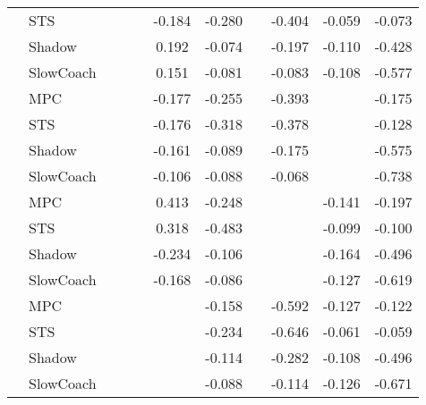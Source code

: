 \begin{tabular}{|l|l|*{9}{c|}}
                                                           & STS &       &        &        & -0.184 & -0.280 &     &  -0.404 &  -0.059 &   -0.073 \\
                                                           & Shadow &       &        &        &  0.192 & -0.074 &     &  -0.197 &  -0.110 &   -0.428 \\
                                                           & SlowCoach &       &        &        &  0.151 & -0.081 &     &  -0.083 &  -0.108 &   -0.577 \\
\midrule
[False, False, False, True, True, False, True, False, True] & MPC &       &        &        & -0.177 & -0.255 &     &  -0.393 &      &   -0.175 \\
                                                           & STS &       &        &        & -0.176 & -0.318 &     &  -0.378 &      &   -0.128 \\
                                                           & Shadow &       &        &        & -0.161 & -0.089 &     &  -0.175 &      &   -0.575 \\
                                                           & SlowCoach &       &        &        & -0.106 & -0.088 &     &  -0.068 &      &   -0.738 \\
\midrule
[False, False, False, True, True, False, False, True, True] & MPC &       &        &        &  0.413 & -0.248 &     &      &  -0.141 &   -0.197 \\
                                                           & STS &       &        &        &  0.318 & -0.483 &     &      &  -0.099 &   -0.100 \\
                                                           & Shadow &       &        &        & -0.234 & -0.106 &     &      &  -0.164 &   -0.496 \\
                                                           & SlowCoach &       &        &        & -0.168 & -0.086 &     &      &  -0.127 &   -0.619 \\
\midrule
[False, False, False, False, True, False, True, True, True] & MPC &       &        &        &     & -0.158 &     &  -0.592 &  -0.127 &   -0.122 \\
                                                           & STS &       &        &        &     & -0.234 &     &  -0.646 &  -0.061 &   -0.059 \\
                                                           & Shadow &       &        &        &     & -0.114 &     &  -0.282 &  -0.108 &   -0.496 \\
                                                           & SlowCoach &       &        &        &     & -0.088 &     &  -0.114 &  -0.126 &   -0.671 \\
\bottomrule
\end{tabular}
